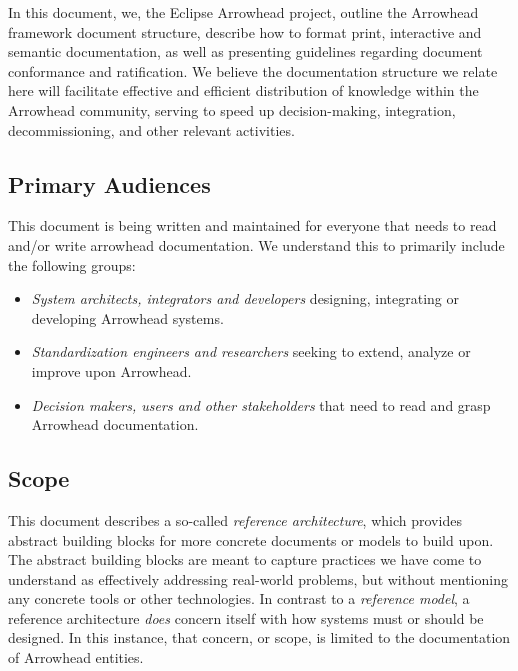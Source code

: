 %
%

In this document, we, the Eclipse Arrowhead project, outline the Arrowhead framework document structure, describe how to format print, interactive and semantic documentation, as well as presenting guidelines regarding document conformance and ratification.
We believe the documentation structure we relate here will facilitate effective and efficient distribution of knowledge within the Arrowhead community, serving to speed up decision-making, integration, decommissioning, and other relevant activities.

\subsection{Primary Audiences}
\label{sec:introduction:audiences}

This document is being written and maintained for everyone that needs to read and/or write arrowhead documentation.
We understand this to primarily include the following groups:

\begin{itemize}
\item \textit{System architects, integrators and developers} designing, integrating or developing Arrowhead systems.
\item \textit{Standardization engineers and researchers} seeking to extend, analyze or improve upon Arrowhead.
\item \textit{Decision makers, users and other stakeholders} that need to read and grasp Arrowhead documentation.
\end{itemize}

\subsection{Scope}
\label{sec:introduction:scope}

This document describes a so-called \textit{reference architecture}, which provides abstract building blocks for more concrete documents or models to build upon.
The abstract building blocks are meant to capture practices we have come to understand as effectively addressing real-world problems, but without mentioning any concrete tools or other technologies.
In contrast to a \textit{reference model}, a reference architecture \textit{does} concern itself with how systems must or should be designed.
In this instance, that concern, or scope, is limited to the documentation of Arrowhead entities.

